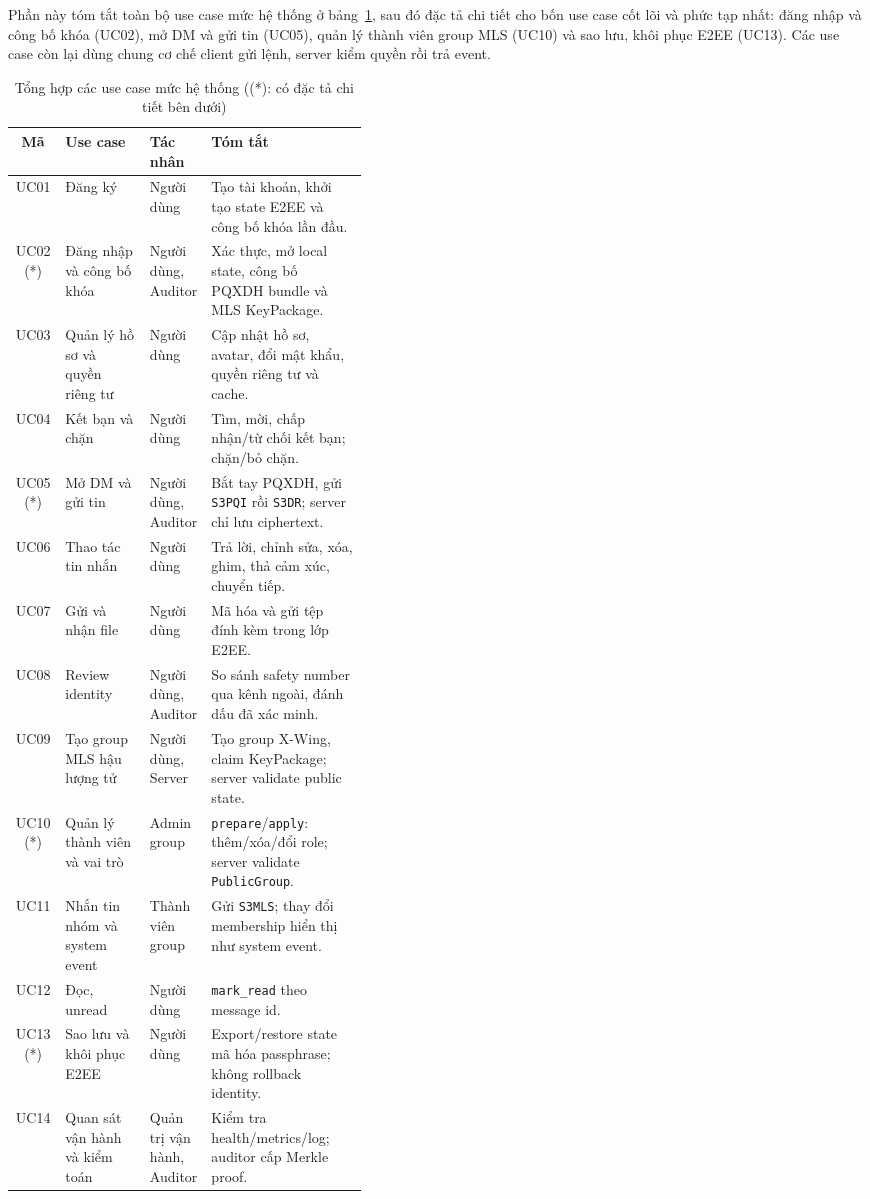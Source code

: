 Phần này tóm tắt toàn bộ use case mức hệ thống ở bảng~\ref{tab:usecase-summary}, sau đó đặc tả chi tiết cho bốn use case cốt lõi và phức tạp nhất: đăng nhập và công bố khóa (UC02), mở DM và gửi tin (UC05), quản lý thành viên group MLS (UC10) và sao lưu, khôi phục E2EE (UC13). Các use case còn lại dùng chung cơ chế client gửi lệnh, server kiểm quyền rồi trả event.

\begin{table}[H]
    \centering
    \small
    \begin{tabularx}{\linewidth}{|c|p{0.24\linewidth}|p{0.17\linewidth}|X|}
        \hline
        \textbf{Mã} & \textbf{Use case} & \textbf{Tác nhân} & \textbf{Tóm tắt} \\
        \hline
        UC01 & Đăng ký & Người dùng & Tạo tài khoản, khởi tạo state E2EE và công bố khóa lần đầu. \\ \hline
        UC02 (*) & Đăng nhập và công bố khóa & Người dùng, Auditor & Xác thực, mở local state, công bố PQXDH bundle và MLS KeyPackage. \\ \hline
        UC03 & Quản lý hồ sơ và quyền riêng tư & Người dùng & Cập nhật hồ sơ, avatar, đổi mật khẩu, quyền riêng tư và cache. \\ \hline
        UC04 & Kết bạn và chặn & Người dùng & Tìm, mời, chấp nhận/từ chối kết bạn; chặn/bỏ chặn. \\ \hline
        UC05 (*) & Mở DM và gửi tin & Người dùng, Auditor & Bắt tay PQXDH, gửi \texttt{S3PQI} rồi \texttt{S3DR}; server chỉ lưu ciphertext. \\ \hline
        UC06 & Thao tác tin nhắn & Người dùng & Trả lời, chỉnh sửa, xóa, ghim, thả cảm xúc, chuyển tiếp. \\ \hline
        UC07 & Gửi và nhận file & Người dùng & Mã hóa và gửi tệp đính kèm trong lớp E2EE. \\ \hline
        UC08 & Review identity & Người dùng, Auditor & So sánh safety number qua kênh ngoài, đánh dấu đã xác minh. \\ \hline
        UC09 & Tạo group MLS hậu lượng tử & Người dùng, Server & Tạo group X-Wing, claim KeyPackage; server validate public state. \\ \hline
        UC10 (*) & Quản lý thành viên và vai trò & Admin group & \texttt{prepare}/\texttt{apply}: thêm/xóa/đổi role; server validate \texttt{PublicGroup}. \\ \hline
        UC11 & Nhắn tin nhóm và system event & Thành viên group & Gửi \texttt{S3MLS}; thay đổi membership hiển thị như system event. \\ \hline
        UC12 & Đọc, unread & Người dùng & \texttt{mark\_read} theo message id. \\ \hline
        UC13 (*) & Sao lưu và khôi phục E2EE & Người dùng & Export/restore state mã hóa passphrase; không rollback identity. \\ \hline
        UC14 & Quan sát vận hành và kiểm toán & Quản trị vận hành, Auditor & Kiểm tra health/metrics/log; auditor cấp Merkle proof. \\ \hline
    \end{tabularx}
    \caption{Tổng hợp các use case mức hệ thống ((*): có đặc tả chi tiết bên dưới)}
    \label{tab:usecase-summary}
\end{table}

